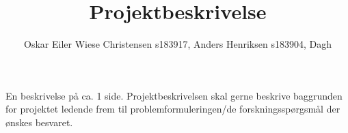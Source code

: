 \documentclass[11pt, fleqn]{article}
\title{Projektbeskrivelse}
\author{Oskar Eiler Wiese Christensen s183917, Anders Henriksen s183904, Dagh}
\begin{document}
	\maketitle
	En beskrivelse på ca. 1 side. Projektbeskrivelsen skal gerne beskrive
	baggrunden for projektet ledende frem til problemformuleringen/de
	forskningsspørgsmål der ønskes besvaret. 
	
\end{document}
